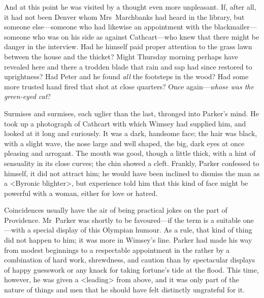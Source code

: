 And at this point he was visited by a thought even more unpleasant. If, after all, it had not been Denver whom Mrs~Marchbanks had heard in the library, but someone else—someone who had likewise an appointment with the blackmailer—someone who was on his side as against Cathcart—who knew that there might be danger in the interview. Had he himself paid proper attention to the grass lawn between the house and the thicket?  Might Thursday morning perhaps have revealed here and there a trodden blade that rain and sap had since restored to uprightness? Had Peter and he found \emph{all} the footsteps in the wood? Had some more trusted hand fired that shot at close quarters? Once again—\emph{whose was the green-eyed cat}?

Surmises and surmises, each uglier than the last, thronged into Parker's mind. He took up a photograph of Cathcart with which Wimsey had supplied him, and looked at it long and curiously. It was a dark, handsome face; the hair was black, with a slight wave, the nose large and well shaped, the big, dark eyes at once pleasing and arrogant. The mouth was good, though a little thick, with a hint of sensuality in its close curves; the chin showed a cleft. Frankly, Parker confessed to himself, it did not attract him; he would have been inclined to dismiss the man as a <Byronic blighter>, but experience told him that this kind of face might be powerful with a woman, either for love or hatred.

Coincidences usually have the air of being practical jokes on the part of Providence. Mr~Parker was shortly to be favoured—if the term is a suitable one—with a special display of this Olympian humour. As a rule, that kind of thing did not happen to him; it was more in Wimsey's line. Parker had made his way from modest beginnings to a respectable appointment in the  rather by a combination of hard work, shrewdness, and caution than by spectacular displays of happy guesswork or any knack for taking fortune's tide at the flood. This time, however, he was given a <leading> from above, and it was only part of the nature of things and men that he should have felt distinctly ungrateful for it.

